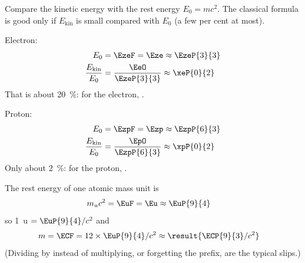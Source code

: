 \begin{abcliste}
\abc Compare the kinetic energy with the rest energy $E_0 = m c^2$. The classical formula is good only if $E_\mathrm{kin}$ is small compared with $E_0$ (a few per cent at most).

Electron:
\begin{align}
 E_0 &= \EzeF = \Eze \approx \EzeP{3}{3} \\
 \frac{E_\mathrm{kin}}{E_0} &= \frac{\EeO}{\EzeP{3}{3}} \approx \xeP{0}{2}
\end{align}
That is about \SI{20}{\percent}: for the electron, .

Proton:
\begin{align}
 E_0 &= \EzpF = \Ezp \approx \EzpP{6}{3} \\
 \frac{E_\mathrm{kin}}{E_0} &= \frac{\EpO}{\EzpP{6}{3}} \approx \xpP{0}{2}
\end{align}
Only about \SI{2}{\percent}: for the proton, .

\abc The rest energy of one atomic mass unit is
\begin{align}
 m_u c^2 &= \EuF = \Eu \approx \EuP{9}{4}
\end{align}
so \SI{1}{\atomicmassunit} $= \EuP{9}{4}/c^2$ and
\begin{align}
 m &= \ECF = 12\times\EuP{9}{4}/c^2 \approx \result{\ECP{9}{3}/c^2}
\end{align}
(Dividing by  instead of multiplying, or forgetting the prefix, are the typical slips.)
\end{abcliste}

